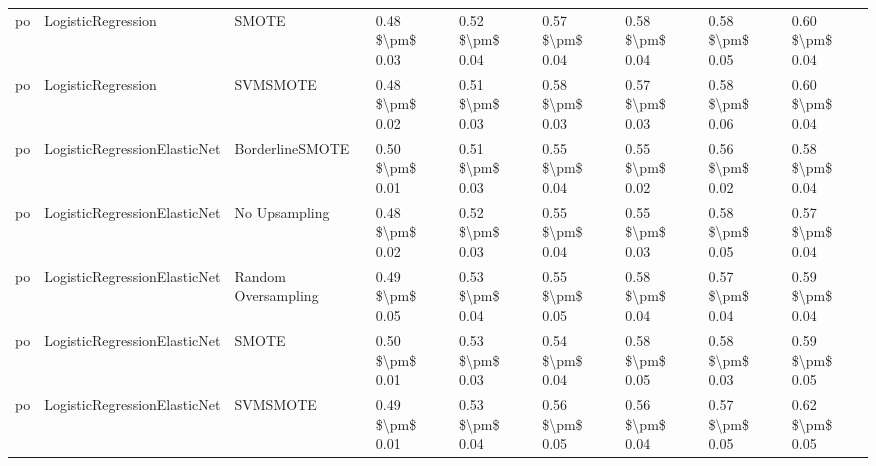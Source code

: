 \begin{tabular}{lllllllll}
      po &              LogisticRegression &                         SMOTE & 0.48 \$\textbackslash pm\$ 0.03 &           0.52 \$\textbackslash pm\$ 0.04 &       0.57 \$\textbackslash pm\$ 0.04 &        0.58 \$\textbackslash pm\$ 0.04 &                         0.58 \$\textbackslash pm\$ 0.05 &     0.60 \$\textbackslash pm\$ 0.04 \\
      po &              LogisticRegression &                      SVMSMOTE & 0.48 \$\textbackslash pm\$ 0.02 &           0.51 \$\textbackslash pm\$ 0.03 &       0.58 \$\textbackslash pm\$ 0.03 &        0.57 \$\textbackslash pm\$ 0.03 &                         0.58 \$\textbackslash pm\$ 0.06 &     0.60 \$\textbackslash pm\$ 0.04 \\
      po &    LogisticRegressionElasticNet &               BorderlineSMOTE & 0.50 \$\textbackslash pm\$ 0.01 &           0.51 \$\textbackslash pm\$ 0.03 &       0.55 \$\textbackslash pm\$ 0.04 &        0.55 \$\textbackslash pm\$ 0.02 &                         0.56 \$\textbackslash pm\$ 0.02 &     0.58 \$\textbackslash pm\$ 0.04 \\
      po &    LogisticRegressionElasticNet &                 No Upsampling & 0.48 \$\textbackslash pm\$ 0.02 &           0.52 \$\textbackslash pm\$ 0.03 &       0.55 \$\textbackslash pm\$ 0.04 &        0.55 \$\textbackslash pm\$ 0.03 &                         0.58 \$\textbackslash pm\$ 0.05 &     0.57 \$\textbackslash pm\$ 0.04 \\
      po &    LogisticRegressionElasticNet &           Random Oversampling & 0.49 \$\textbackslash pm\$ 0.05 &           0.53 \$\textbackslash pm\$ 0.04 &       0.55 \$\textbackslash pm\$ 0.05 &        0.58 \$\textbackslash pm\$ 0.04 &                         0.57 \$\textbackslash pm\$ 0.04 &     0.59 \$\textbackslash pm\$ 0.04 \\
      po &    LogisticRegressionElasticNet &                         SMOTE & 0.50 \$\textbackslash pm\$ 0.01 &           0.53 \$\textbackslash pm\$ 0.03 &       0.54 \$\textbackslash pm\$ 0.04 &        0.58 \$\textbackslash pm\$ 0.05 &                         0.58 \$\textbackslash pm\$ 0.03 &     0.59 \$\textbackslash pm\$ 0.05 \\
      po &    LogisticRegressionElasticNet &                      SVMSMOTE & 0.49 \$\textbackslash pm\$ 0.01 &           0.53 \$\textbackslash pm\$ 0.04 &       0.56 \$\textbackslash pm\$ 0.05 &        0.56 \$\textbackslash pm\$ 0.04 &                         0.57 \$\textbackslash pm\$ 0.05 &     0.62 \$\textbackslash pm\$ 0.05 \\

\end{tabular}

